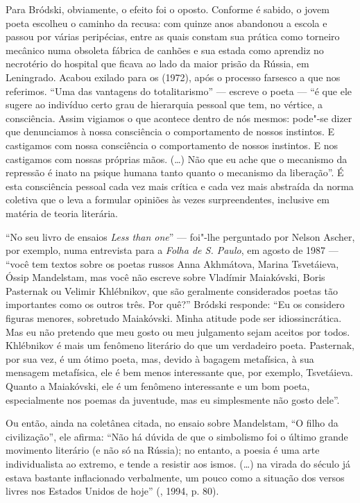 Para Bródski, obviamente, o efeito foi o oposto. Conforme é sabido, o jovem
poeta escolheu o caminho da recusa: com quinze anos abandonou a escola
e passou por várias peripécias, entre as quais constam sua prática como
torneiro mecânico numa obsoleta fábrica de canhões e sua estada como aprendiz no
necrotério do hospital que ficava ao lado da maior prisão da Rússia, em
Leningrado. Acabou exilado para os  (1972), após o processo
farsesco a que nos referimos. ``Uma das vantagens do totalitarismo'' ---
escreve o poeta --- ``é que ele sugere ao indivíduo certo grau de
hierarquia pessoal que tem, no vértice, a consciência. Assim vigiamos o
que acontece dentro de nós mesmos: pode"-se dizer que denunciamos à nossa
consciência o comportamento de nossos instintos. E castigamos com nossa
consciência o comportamento de nossos instintos. E nos castigamos com
nossas próprias mãos. (\ldots{}) Não que eu ache que o mecanismo da repressão
é inato na psique humana tanto quanto o mecanismo da liberação''. É esta
consciência pessoal cada vez mais crítica e cada vez mais abstraída da
norma coletiva que o leva a formular opiniões às vezes surpreendentes,
inclusive em matéria de teoria literária.

``No seu livro de ensaios \emph{Less than one}'' --- foi"-lhe perguntado
por Nelson Ascher, por exemplo, numa entrevista para a \emph{Folha de S. Paulo},
em agosto de 1987 --- ``você tem textos sobre os poetas russos Anna
Akhmátova, Marina Tsvetáieva, Óssip Mandelstam, mas você não escreve
sobre Vladímir Maiakóvski, Boris Pasternak ou Velimir Khlébnikov, que
são geralmente considerados poetas tão importantes como os outros três.
Por quê?'' Bródski responde: ``Eu os considero figuras menores, sobretudo Maiakóvski. Minha
atitude pode ser idiossincrática. Mas eu não pretendo que meu gosto ou
meu julgamento sejam aceitos por todos. Khlébnikov é mais um fenômeno
literário do que um verdadeiro poeta. Pasternak, por sua vez, é um ótimo
poeta, mas, devido à bagagem metafísica, à sua mensagem metafísica, ele é
bem menos interessante que, por exemplo, Tsvetáieva. Quanto a
Maiakóvski, ele é um fenômeno interessante e um bom poeta, especialmente
nos poemas da juventude, mas eu simplesmente não gosto dele''.

Ou então, ainda na coletânea citada, no ensaio sobre Mandelstam, ``O filho da civilização'', ele
afirma: ``Não há dúvida de que o simbolismo foi o último grande movimento literário (e não
só na Rússia); no entanto, a poesia é uma arte
individualista ao extremo, e tende a resistir aos ismos. (\ldots{}) na virada do século já 
estava bastante inflacionado verbalmente, um pouco como a situação
 dos versos livres nos Estados Unidos de hoje'' (, 1994, p. 80). 

